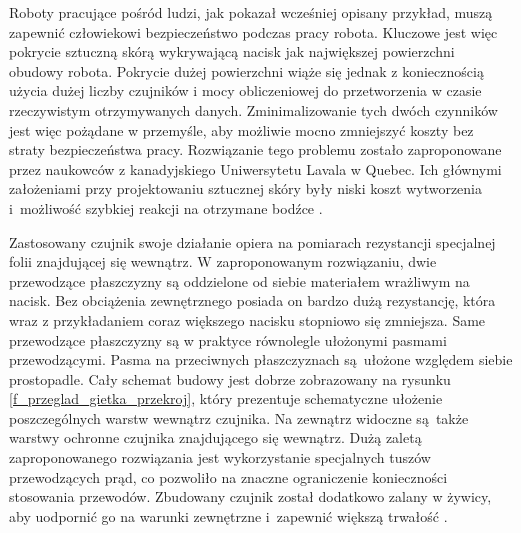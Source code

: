 Roboty pracujące pośród ludzi, jak pokazał wcześniej opisany przykład, muszą zapewnić człowiekowi bezpieczeństwo podczas pracy robota. Kluczowe jest więc pokrycie sztuczną skórą wykrywającą nacisk jak największej powierzchni obudowy robota. Pokrycie dużej powierzchni wiąże się jednak z koniecznością użycia dużej liczby czujników i mocy obliczeniowej do przetworzenia w czasie rzeczywistym otrzymywanych danych. Zminimalizowanie tych dwóch czynników jest więc pożądane w przemyśle, aby możliwie mocno zmniejszyć koszty bez straty bezpieczeństwa pracy. Rozwiązanie tego problemu zostało zaproponowane przez naukowców z kanadyjskiego Uniwersytetu Lavala w Quebec. Ich głównymi założeniami przy projektowaniu sztucznej skóry były niski koszt wytworzenia i~możliwość szybkiej reakcji na otrzymane bodźce
\cite{b_konf_gietka_przekroj}.

Zastosowany czujnik swoje działanie opiera na pomiarach rezystancji specjalnej folii znajdującej się wewnątrz. W zaproponowanym rozwiązaniu, dwie przewodzące płaszczyzny są oddzielone od siebie materiałem wrażliwym na nacisk. Bez obciążenia zewnętrznego posiada on bardzo dużą rezystancję, która wraz z przykładaniem coraz większego nacisku stopniowo się zmniejsza. Same przewodzące płaszczyzny są w praktyce równolegle ułożonymi pasmami przewodzącymi. Pasma na przeciwnych płaszczyznach są~ułożone względem siebie prostopadle. Cały schemat budowy jest dobrze zobrazowany na rysunku \ref{f_przeglad_gietka_przekroj}, który prezentuje schematyczne ułożenie poszczególnych warstw wewnątrz czujnika. Na zewnątrz widoczne są~także warstwy ochronne czujnika znajdującego się wewnątrz. Dużą zaletą zaproponowanego rozwiązania jest wykorzystanie specjalnych tuszów przewodzących prąd, co pozwoliło na znaczne ograniczenie konieczności stosowania przewodów. Zbudowany czujnik został dodatkowo zalany w żywicy, aby uodpornić go na warunki zewnętrzne i~zapewnić większą trwałość \cite{b_konf_gietka_przekroj}.

